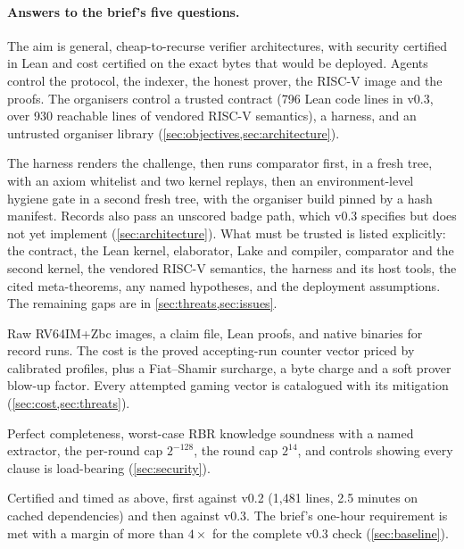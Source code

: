 \paragraph{Answers to the brief's five questions.}
\begin{description}[leftmargin=0pt,itemsep=2pt]
\item[Objective and design.] The aim is general, cheap-to-recurse verifier architectures, with
  security certified in Lean and cost certified on the exact bytes that would be deployed. Agents
  control the protocol, the indexer, the honest prover, the RISC-V image and the proofs. The
  organisers control a trusted contract (796 Lean code lines in v0.3, over 930 reachable lines of
  vendored RISC-V semantics), a harness, and an untrusted organiser library
  (\cref{sec:objectives,sec:architecture}).
\item[Rules, trust and gaps.] The harness renders the challenge, then runs comparator first, in a
  fresh tree, with an axiom whitelist and two kernel replays, then an environment-level hygiene gate
  in a second fresh tree, with the organiser build pinned by a hash manifest. Records also pass an
  unscored badge path, which v0.3 specifies but does not yet implement (\cref{sec:architecture}).
  What must be trusted is listed explicitly: the contract, the Lean kernel, elaborator, Lake and
  compiler, comparator and the second kernel, the vendored RISC-V semantics, the harness and its host
  tools, the cited meta-theorems, any named hypotheses, and the deployment assumptions. The remaining
  gaps are in \cref{sec:threats,sec:issues}.
\item[Submission format and cost.] Raw RV64IM+Zbc images, a claim file, Lean proofs, and native
  binaries for record runs. The cost is the proved accepting-run counter vector priced by calibrated
  profiles, plus a Fiat--Shamir surcharge, a byte charge and a soft prover blow-up factor. Every
  attempted gaming vector is catalogued with its mitigation (\cref{sec:cost,sec:threats}).
\item[Security definitions.] Perfect completeness, worst-case RBR knowledge soundness with a named
  extractor, the per-round cap $2^{-128}$, the round cap $2^{14}$, and controls showing every clause
  is load-bearing (\cref{sec:security}).
\item[Baseline.] Certified and timed as above, first against v0.2 (1{,}481 lines, 2.5 minutes on
  cached dependencies) and then against v0.3. The brief's one-hour requirement is met with a margin of
  more than $4\times$ for the complete v0.3 check (\cref{sec:baseline}).
\end{description}


